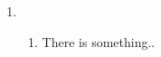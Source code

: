 \documentclass{article}
\begin{document}
\thispagestyle{fancy} %

\begin{enumerate}


	\item 
	
	\begin{enumerate}
		
		\item There is something..
		
	\end{enumerate}



\end{enumerate}
\end{document}
